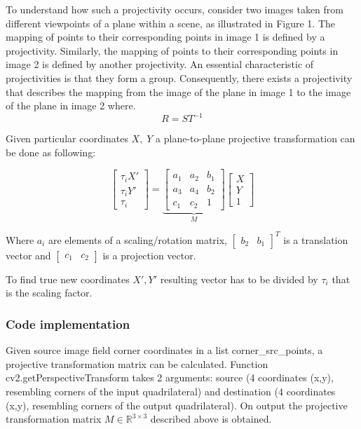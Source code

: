 To understand how such a projectivity occurs, consider two images taken from different viewpoints of a plane within a scene, as illustrated in Figure 1. The mapping of points to their corresponding points in image 1 is defined by a projectivity. Similarly, the mapping of points to their corresponding points in image 2 is defined by another projectivity. An essential characteristic of projectivities is that they form a group. Consequently, there exists a projectivity that describes the mapping from the image of the plane in image 1 to the image of the plane in image 2 where.
$$ R = ST^{-1}$$

Given particular coordinates $X,\;Y$ a plane-to-plane projective transformation can be done as following:

$$
\begin{bmatrix}
\tau_{i}X' \\
\tau_{i}Y' \\
\tau_{i}
\end{bmatrix} = 
\underbrace{ \begin{bmatrix}
a_{1} & a_{2} & b_{1} \\
a_{3} & a_{4} & b_{2} \\
c_{1} & c_{2} & 1
\end{bmatrix} }_{ M } \begin{bmatrix}
X \\
Y \\
1
\end{bmatrix}
$$

Where $a_i$ are elements of a scaling/rotation matrix, $\begin{bmatrix}
    b_2 & b_1
\end{bmatrix}^T$ is a translation vector and $\begin{bmatrix}
    c_1 & c_2
\end{bmatrix}$ is a projection vector.

To find true new coordinates $X', Y'$ resulting vector has to be divided by $\tau_i$ that is the scaling factor. 

\subsubsection{Code implementation}

Given source image field corner coordinates in a list corner\_src\_points, a projective transformation matrix can be calculated. Function cv2.getPerspectiveTransform takes 2 arguments: source (4 coordinates (x,y), resembling corners of the input quadrilateral) and destination (4 coordinates (x,y), resembling corners of the output quadrilateral). On output the projective transformation matrix $M \in \mathbb{R}^{3 \times 3}$ described above is obtained.


